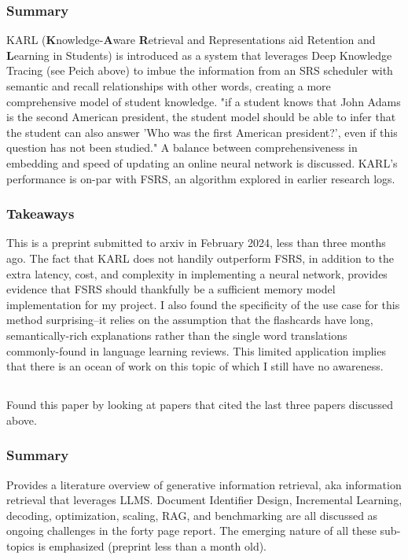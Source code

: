 \documentclass[
	letterpaper, %
]{jdf}
\begin{document}
\subsubsection{Summary}
KARL (\textbf{K}nowledge-\textbf{A}ware \textbf{R}etrieval and Representations aid Retention and \textbf{L}earning in Students) is introduced as a system that leverages Deep Knowledge Tracing (see Peich above) to imbue the information from an SRS scheduler with semantic and recall relationships with other words, creating a more comprehensive model of student knowledge. "if a student knows that John Adams is the second American president, the student model should be able to infer that the student can also answer 'Who was the first American president?', even if this question has not been studied." A balance between comprehensiveness in embedding and speed of updating an online neural network is discussed. KARL's performance is on-par with FSRS, an algorithm explored in earlier research logs.

\subsubsection{Takeaways}
This is a preprint submitted to arxiv in February 2024, less than three months ago. The fact that KARL does not handily outperform FSRS, in addition to the extra latency, cost, and complexity in implementing a neural network, provides evidence that FSRS should thankfully be a sufficient memory model implementation for my project. I also found the specificity of the use case for this method surprising–it relies on the assumption that the flashcards have long, semantically-rich explanations rather than the single word translations commonly-found in language learning reviews. This limited application implies that there is an ocean of work on this topic of which I still have no awareness.

\subsection{}
Found this paper by looking at papers that cited the last three papers discussed above.

\subsubsection{Summary}
Provides a literature overview of generative information retrieval, aka information retrieval that leverages LLMS. Document Identifier Design, Incremental Learning, decoding, optimization, scaling, RAG, and benchmarking are all discussed as ongoing challenges in the forty page report. The emerging nature of all these sub-topics is emphasized (preprint less than a month old).
\end{document}
